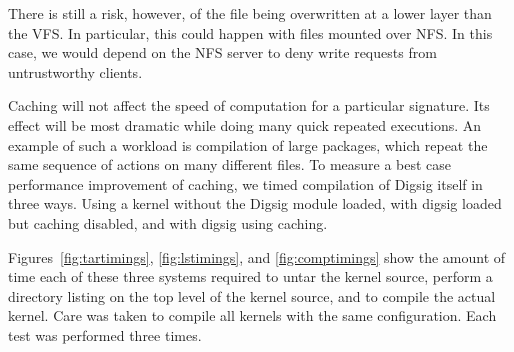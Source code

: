 \documentclass{article}
\begin{document}
There is still a risk, however, of the file being overwritten at a lower
layer than the VFS.  In particular, this could happen with files mounted
over NFS.  In this case, we would depend on the NFS server to deny write
requests from untrustworthy clients.

Caching will not affect the speed of computation for a particular
signature.  Its effect will be most dramatic while doing many quick
repeated executions.  An example of such a workload is compilation of
large packages, which repeat the same sequence of actions on many different
files.  To measure a best case performance improvement of
caching, we timed compilation of Digsig itself in three ways.  Using a kernel
without the Digsig module loaded, with digsig loaded but caching
disabled, and with digsig using caching.

Figures~\ref{fig:tartimings}, \ref{fig:lstimings}, and \ref{fig:comptimings} show
the amount of time
each of these three systems required to untar the kernel source, perform a
directory listing on the top level of the kernel source, and to compile the
actual kernel.  Care was taken to compile all kernels with the same configuration.
Each test was performed three times.
\end{document}
